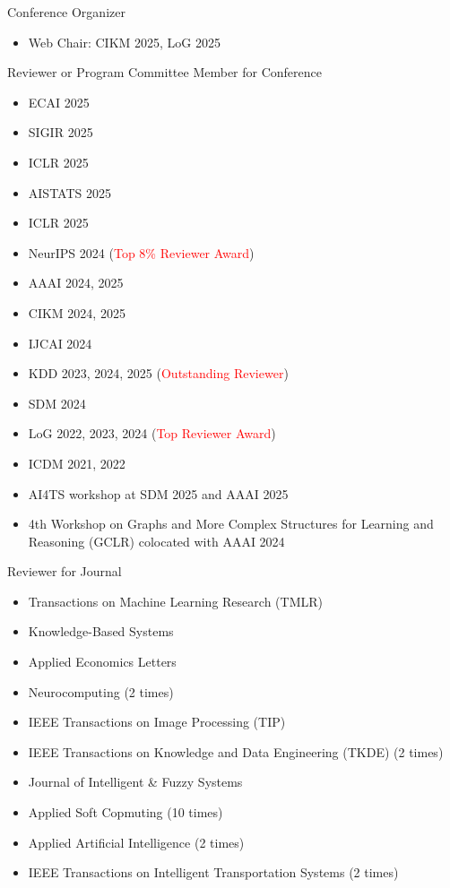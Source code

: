 \documentclass[10pt]{article}
\newenvironment{changemargin}[2]{
  \begin{list}{}{
    \setlength{\topsep}{0pt}
    \setlength{\leftmargin}{#1}
    \setlength{\rightmargin}{#2}
    \setlength{\listparindent}{\parindent}
    \setlength{\itemindent}{\parindent}
    \setlength{\parsep}{\parskip}
  }
  \item[]}{\end{list}
}
\newcommand{\RED}[1]{\textcolor{red}{#1}}
\newenvironment{body} {
	\vspace*{-16pt}
	\begin{changemargin}{-0.25in}{-0.5in}
  }
	{\end{changemargin}
}
\begin{document}
\begin{body}
	\vspace{14pt}
    Conference Organizer
    \begin{itemize}
        \item Web Chair: CIKM 2025, LoG 2025
    \end{itemize}
   Reviewer or Program Committee Member for Conference
    \begin{itemize}
        \item ECAI 2025
        \item SIGIR 2025
        \item ICLR 2025
        \item AISTATS 2025
        \item ICLR 2025
        \item NeurIPS 2024 (\RED{Top 8\% Reviewer Award})
        \item AAAI 2024, 2025
        \item CIKM 2024, 2025
        \item IJCAI 2024
        \item KDD 2023, 2024, 2025 (\RED{Outstanding Reviewer})
        \item SDM 2024
        \item LoG 2022, 2023, 2024 (\RED{Top Reviewer Award})
        \item ICDM 2021, 2022
        \item AI4TS workshop at SDM 2025 and AAAI 2025
        \item 4th Workshop on Graphs and More Complex Structures for Learning and Reasoning (GCLR) colocated with AAAI 2024
    \end{itemize}
    Reviewer for Journal
    \begin{itemize}
        \item Transactions on Machine Learning Research (TMLR)
        \item Knowledge-Based Systems
        \item Applied Economics Letters
        \item Neurocomputing (2 times)
        \item IEEE Transactions on Image Processing (TIP)
        \item IEEE Transactions on Knowledge and Data Engineering (TKDE) (2 times)
        \item Journal of Intelligent \& Fuzzy Systems
        \item Applied Soft Copmuting (10 times)
        \item Applied Artificial Intelligence (2 times)
        \item IEEE Transactions on Intelligent Transportation Systems (2 times)
    \end{itemize}
\end{body}
\end{document}

